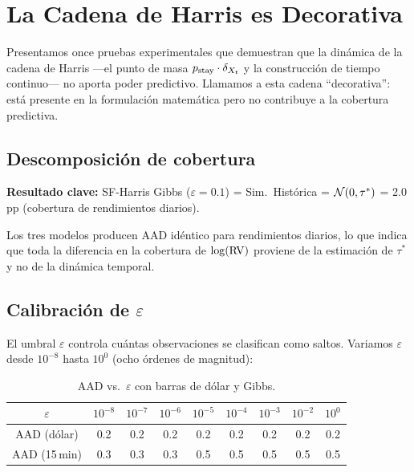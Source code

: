 
\chapter{La Cadena de Harris es Decorativa}
\label{ch:cadena-decorativa}

Presentamos once pruebas experimentales que demuestran que la din\'{a}mica de la cadena
de Harris ---el punto de masa $p_{\text{stay}} \cdot \delta_{X_t}$ y la construcci\'{o}n de
tiempo continuo--- no aporta poder predictivo. Llamamos a esta cadena ``decorativa'':
est\'{a} presente en la formulaci\'{o}n matem\'{a}tica pero no contribuye a la
cobertura predictiva.

\section{Descomposici\'{o}n de cobertura}

\textbf{Resultado clave:} SF-Harris Gibbs ($\varepsilon=0.1$) = Sim.\ Hist\'{o}rica =
$\mathcal{N}(0, \tau^*)$ = 2.0\,pp (cobertura de rendimientos diarios).

Los tres modelos producen AAD id\'{e}ntico para rendimientos diarios, lo que indica
que toda la diferencia en la cobertura de $\log(\operatorname{RV})$ proviene de la estimaci\'{o}n de
$\tau^*$ y no de la din\'{a}mica temporal.

\section{Calibraci\'{o}n de $\varepsilon$}

El umbral $\varepsilon$ controla cu\'{a}ntas observaciones se clasifican como saltos.
Variamos $\varepsilon$ desde $10^{-8}$ hasta $10^{0}$ (ocho \'{o}rdenes de magnitud):

\begin{table}[h]
\centering
\caption{AAD vs.\ $\varepsilon$ con barras de d\'{o}lar y Gibbs.}
\begin{tabular}{ccccccccc}
\toprule
$\varepsilon$ & $10^{-8}$ & $10^{-7}$ & $10^{-6}$ & $10^{-5}$ & $10^{-4}$ & $10^{-3}$ & $10^{-2}$ & $10^{0}$ \\
\midrule
AAD (d\'{o}lar) & 0.2 & 0.2 & 0.2 & 0.2 & 0.2 & 0.2 & 0.2 & 0.2 \\
AAD (15\,min) & 0.3 & 0.3 & 0.3 & 0.5 & 0.5 & 0.5 & 0.5 & 0.5 \\
\bottomrule
\end{tabular}
\end{table}

